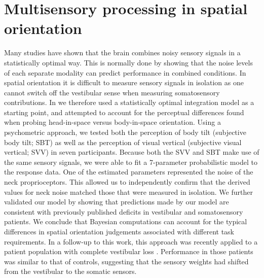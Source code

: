 \section{Multisensory processing in spatial orientation}
Many studies have shown that the brain combines noisy sensory signals in a statistically optimal way. This is normally done by showing that the noise levels of each separate modality can predict performance in combined conditions. In spatial orientation it is difficult to measure sensory signals in isolation as one cannot switch off the vestibular sense when measuring somatosensory contributions. In  we therefore used a statistically optimal integration model as a starting point, and attempted to account for the perceptual differences found when probing head-in-space versus body-in-space orientation. Using a psychometric approach, we tested both the perception of body tilt (subjective body tilt; SBT) as well as the perception of visual vertical (subjective visual vertical; SVV) in seven participants. Because both the SVV and SBT make use of the same sensory signals, we were able to fit a 7-parameter probabilistic model to the response data.  One  of the estimated parameters represented the noise of the neck proprioceptors. This allowed us to independently confirm that the derived values for neck noise matched those that were measured in isolation. We further validated our model by showing that predictions made by our model are consistent with previously published deficits in vestibular and somatosensory patients. We conclude that Bayesian computations can account for the typical differences in spatial orientation judgements associated with different task requirements. In a follow-up to this work, this approach was recently applied to a patient population with complete  vestibular loss \cite{alberts2015}. Performance in those patients was similar to that of controls, suggesting that the sensory weights had shifted from the vestibular to the somatic sensors.

